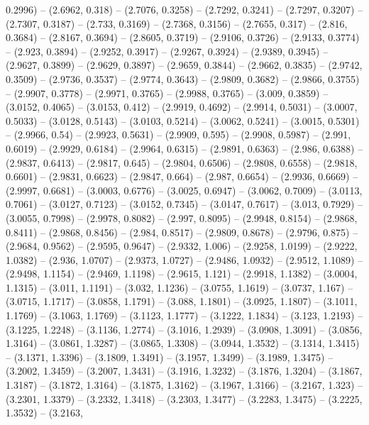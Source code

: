 {  0.2996) -- (2.6962, 0.318) -- (2.7076, 0.3258) -- (2.7292, 0.3241) -- (2.7297,
   0.3207) -- (2.7307, 0.3187) -- (2.733, 0.3169) -- (2.7368, 0.3156) -- 
  (2.7655, 0.317) -- (2.816, 0.3684) -- (2.8167, 0.3694) -- (2.8605, 0.3719) -- 
  (2.9106, 0.3726) -- (2.9133, 0.3774) -- (2.923, 0.3894) -- (2.9252, 0.3917) --
   (2.9267, 0.3924) -- (2.9389, 0.3945) -- (2.9627, 0.3899) -- (2.9629, 0.3897) 
  -- (2.9659, 0.3844) -- (2.9662, 0.3835) -- (2.9742, 0.3509) -- (2.9736, 
  0.3537) -- (2.9774, 0.3643) -- (2.9809, 0.3682) -- (2.9866, 0.3755) -- 
  (2.9907, 0.3778) -- (2.9971, 0.3765) -- (2.9988, 0.3765) -- (3.009, 0.3859) --
   (3.0152, 0.4065) -- (3.0153, 0.412) -- (2.9919, 0.4692) -- (2.9914, 0.5031) 
  -- (3.0007, 0.5033) -- (3.0128, 0.5143) -- (3.0103, 0.5214) -- (3.0062, 
  0.5241) -- (3.0015, 0.5301) -- (2.9966, 0.54) -- (2.9923, 0.5631) -- (2.9909, 
  0.595) -- (2.9908, 0.5987) -- (2.991, 0.6019) -- (2.9929, 0.6184) -- (2.9964, 
  0.6315) -- (2.9891, 0.6363) -- (2.986, 0.6388) -- (2.9837, 0.6413) -- (2.9817,
   0.645) -- (2.9804, 0.6506) -- (2.9808, 0.6558) -- (2.9818, 0.6601) -- 
  (2.9831, 0.6623) -- (2.9847, 0.664) -- (2.987, 0.6654) -- (2.9936, 0.6669) -- 
  (2.9997, 0.6681) -- (3.0003, 0.6776) -- (3.0025, 0.6947) -- (3.0062, 0.7009) 
  -- (3.0113, 0.7061) -- (3.0127, 0.7123) -- (3.0152, 0.7345) -- (3.0147, 
  0.7617) -- (3.013, 0.7929) -- (3.0055, 0.7998) -- (2.9978, 0.8082) -- (2.997, 
  0.8095) -- (2.9948, 0.8154) -- (2.9868, 0.8411) -- (2.9868, 0.8456) -- (2.984,
   0.8517) -- (2.9809, 0.8678) -- (2.9796, 0.875) -- (2.9684, 0.9562) -- 
  (2.9595, 0.9647) -- (2.9332, 1.006) -- (2.9258, 1.0199) -- (2.9222, 1.0382) --
   (2.936, 1.0707) -- (2.9373, 1.0727) -- (2.9486, 1.0932) -- (2.9512, 1.1089) 
  -- (2.9498, 1.1154) -- (2.9469, 1.1198) -- (2.9615, 1.121) -- (2.9918, 1.1382)
   -- (3.0004, 1.1315) -- (3.011, 1.1191) -- (3.032, 1.1236) -- (3.0755, 1.1619)
   -- (3.0737, 1.167) -- (3.0715, 1.1717) -- (3.0858, 1.1791) -- (3.088, 1.1801)
   -- (3.0925, 1.1807) -- (3.1011, 1.1769) -- (3.1063, 1.1769) -- (3.1123, 
  1.1777) -- (3.1222, 1.1834) -- (3.123, 1.2193) -- (3.1225, 1.2248) -- (3.1136,
   1.2774) -- (3.1016, 1.2939) -- (3.0908, 1.3091) -- (3.0856, 1.3164) -- 
  (3.0861, 1.3287) -- (3.0865, 1.3308) -- (3.0944, 1.3532) -- (3.1314, 1.3415) 
  -- (3.1371, 1.3396) -- (3.1809, 1.3491) -- (3.1957, 1.3499) -- (3.1989, 
  1.3475) -- (3.2002, 1.3459) -- (3.2007, 1.3431) -- (3.1916, 1.3232) -- 
  (3.1876, 1.3204) -- (3.1867, 1.3187) -- (3.1872, 1.3164) -- (3.1875, 1.3162) 
  -- (3.1967, 1.3166) -- (3.2167, 1.323) -- (3.2301, 1.3379) -- (3.2332, 1.3418)
   -- (3.2303, 1.3477) -- (3.2283, 1.3475) -- (3.2225, 1.3532) -- (3.2163, 
}
